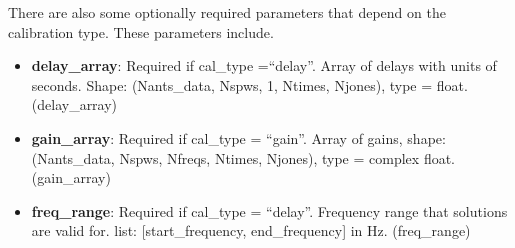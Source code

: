 \documentclass[11pt, oneside, english]{article}   	%
\begin{document}

There are also some optionally required parameters that depend on the
calibration type. These parameters include.
\begin{itemize}
\item{\textbf{delay\_array}: Required if cal\_type =``delay''. Array of delays with
    units of seconds. Shape: (Nants\_data, Nspws, 1, Ntimes, Njones), type = float. (delay\_array)}
\item{\textbf{gain\_array}: Required if cal\_type = ``gain''. Array of gains, 
    shape: (Nants\_data, Nspws, Nfreqs, Ntimes, Njones), type = complex float. (gain\_array)}
\item{\textbf{freq\_range}: Required if cal\_type = ``delay''. Frequency range that
   solutions are valid for. list: [start\_frequency, end\_frequency] in Hz. (freq\_range)}
\end{itemize}
\end{document}

